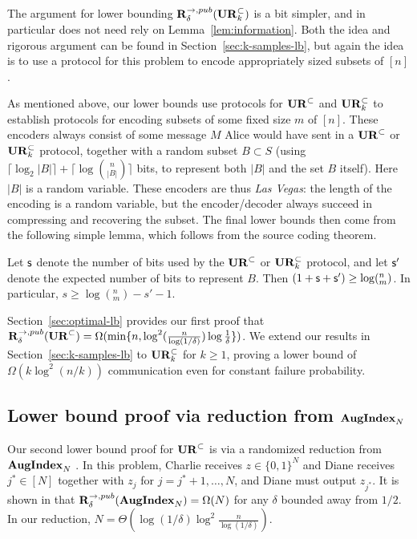 The argument for lower bounding $\mathbf{R}^{\rightarrow,pub}_\delta(\mathbf{UR}_k^\subset)$ is a bit simpler, and in particular does not need rely on Lemma~\ref{lem:information}. Both the idea and rigorous argument can be found in Section~\ref{sec:k-samples-lb}, but again the idea is to use a protocol for this problem to encode appropriately sized subsets of $[n]$.
 
As mentioned above, our lower bounds use protocols for $\mathbf{UR}^\subset$ and $\mathbf{UR}^\subset_k$ to establish protocols for encoding subsets of some fixed size $m$ of $[n]$. These encoders always consist of some message $M$ Alice would have sent in a $\mathbf{UR}^\subset$ or $\mathbf{UR}^\subset_k$ protocol, together with a random subset $B\subset S$ (using $\lceil \log_2|B|\rceil + \lceil\log{n\choose |B|}\rceil$ bits, to represent both $|B|$ and the set $B$ itself). Here $|B|$ is a random variable. These encoders are thus {\em Las Vegas}: the length of the encoding is a random variable, but the encoder/decoder always succeed in compressing and recovering the subset. The final lower bounds then come from the following simple lemma, which follows from the source coding theorem. 

\begin{lemma} \label{lemma:lb-meta}
  Let $\textsf{s}$ denote the number of bits used by the $\mathbf{UR}^\subset$ or $\mathbf{UR}^\subset_k$ protocol, and let $\textsf{s}'$ denote the expected number of bits to represent $B$. Then $(1+\textsf{s}+\textsf{s}') \ge \log (^n_m)$. In particular, $s \ge \log(^n_m) - s' - 1$.
\end{lemma}

Section~\ref{sec:optimal-lb} provides our first proof that $\mathbf{R}^{\rightarrow,pub}_\delta(\mathbf{UR}^\subset) = \Omega(\min\{n, \log^2(\frac n{\log(1/\delta)}) \log \frac{1}{\delta}\})$. We extend our results in Section~\ref{sec:k-samples-lb} to $\mathbf{UR}_k^\subset$ for $k\ge 1$, proving a lower bound of $\Omega(k\log^2(n/k))$ communication even for constant failure probability.

\subsection{Lower bound proof via reduction from $\mathbf{AugIndex}_N$}

Our second lower bound proof for $\mathbf{UR}^\subset$ is via a randomized reduction from $\mathbf{AugIndex}_N$ \cite{MiltersenNSW98}. In this problem, Charlie receives $z\in\{0,1\}^N$ and Diane receives $j^*\in[N]$ together with $z_j$ for $j=j^*+1,\ldots,N$, and Diane must output $z_{j^*}$. It is shown in \cite{MiltersenNSW98} that $\mathbf{R}^{\rightarrow, pub}_\delta(\mathbf{AugIndex}_N) = \Omega(N)$ for any $\delta$ bounded away from $1/2$. In our reduction, $N = \Theta(\log(1/\delta)\log^2\frac n{\log(1/\delta)})$.

